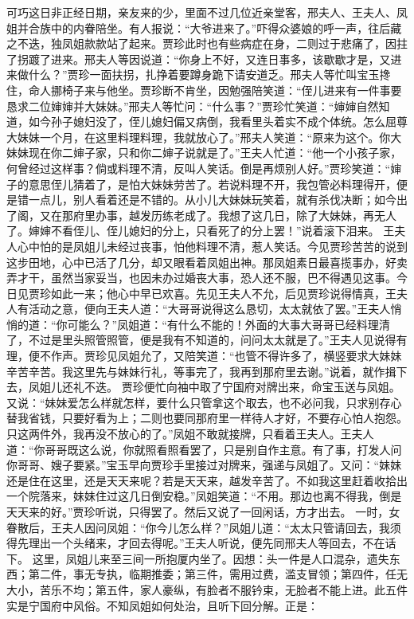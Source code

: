 \documentclass[12pt,oneside]{book}
\begin{document}
可巧这日非正经日期，亲友来的少，里面不过几位近亲堂客，邢夫人、王夫人、凤姐并合族中的内眷陪坐。有人报说：“大爷进来了。”吓得众婆娘的呼一声，往后藏之不迭，独凤姐款款站了起来。贾珍此时也有些病症在身，二则过于悲痛了，因拄了拐踱了进来。邢夫人等因说道：“你身上不好，又连日事多，该歇歇才是，又进来做什么？”贾珍一面扶拐，扎挣着要蹲身跪下请安道乏。邢夫人等忙叫宝玉搀住，命人挪椅子来与他坐。贾珍断不肯坐，因勉强陪笑道：“侄儿进来有一件事要恳求二位婶婶并大妹妹。”邢夫人等忙问：“什么事？”贾珍忙笑道：“婶婶自然知道，如今孙子媳妇没了，侄儿媳妇偏又病倒，我看里头着实不成个体统。怎么屈尊大妹妹一个月，在这里料理料理，我就放心了。”邢夫人笑道：“原来为这个。你大妹妹现在你二婶子家，只和你二婶子说就是了。”王夫人忙道：“他一个小孩子家，何曾经过这样事？倘或料理不清，反叫人笑话。倒是再烦别人好。”贾珍笑道：“婶子的意思侄儿猜着了，是怕大妹妹劳苦了。若说料理不开，我包管必料理得开，便是错一点儿，别人看着还是不错的。从小儿大妹妹玩笑着，就有杀伐决断；如今出了阁，又在那府里办事，越发历练老成了。我想了这几日，除了大妹妹，再无人了。婶婶不看侄儿、侄儿媳妇的分上，只看死了的分上罢！”说着滚下泪来。
王夫人心中怕的是凤姐儿未经过丧事，怕他料理不清，惹人笑话。今见贾珍苦苦的说到这步田地，心中已活了几分，却又眼看着凤姐出神。那凤姐素日最喜揽事办，好卖弄才干，虽然当家妥当，也因未办过婚丧大事，恐人还不服，巴不得遇见这事。今日见贾珍如此一来；他心中早已欢喜。先见王夫人不允，后见贾珍说得情真，王夫人有活动之意，便向王夫人道：“大哥哥说得这么恳切，太太就依了罢。”王夫人悄悄的道：“你可能么？”凤姐道：“有什么不能的！外面的大事大哥哥已经料理清了，不过是里头照管照管，便是我有不知道的，问问太太就是了。”王夫人见说得有理，便不作声。贾珍见凤姐允了，又陪笑道：“也管不得许多了，横竖要求大妹妹辛苦辛苦。我这里先与妹妹行礼，等事完了，我再到那府里去谢。”说着，就作揖下去，凤姐儿还礼不迭。
贾珍便忙向袖中取了宁国府对牌出来，命宝玉送与凤姐。又说：“妹妹爱怎么样就怎样，要什么只管拿这个取去，也不必问我，只求别存心替我省钱，只要好看为上；二则也要同那府里一样待人才好，不要存心怕人抱怨。只这两件外，我再没不放心的了。”凤姐不敢就接牌，只看着王夫人。王夫人道：“你哥哥既这么说，你就照看照看罢了，只是别自作主意。有了事，打发人问你哥哥、嫂子要紧。”宝玉早向贾珍手里接过对牌来，强递与凤姐了。又问：“妹妹还是住在这里，还是天天来呢？若是天天来，越发辛苦了。不如我这里赶着收拾出一个院落来，妹妹住过这几日倒安稳。”凤姐笑道：“不用。那边也离不得我，倒是天天来的好。”贾珍听说，只得罢了。然后又说了一回闲话，方才出去。
一时，女眷散后，王夫人因问凤姐：“你今儿怎么样？”凤姐儿道：“太太只管请回去，我须得先理出一个头绪来，才回去得呢。”王夫人听说，便先同邢夫人等回去，不在话下。
这里，凤姐儿来至三间一所抱厦内坐了。因想：头一件是人口混杂，遗失东西；第二件，事无专执，临期推委；第三件，需用过费，滥支冒领；第四件，任无大小，苦乐不均；第五件，家人豪纵，有脸者不服钤束，无脸者不能上进。此五件实是宁国府中风俗。不知凤姐如何处治，且听下回分解。正是：
\end{document}
